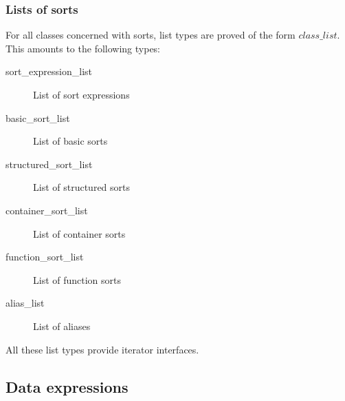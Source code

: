 \documentclass[a4paper,11pt]{article}
\newcommand{\comment}[1]{\begin{quotation} {\sf *** #1 ***} \end{quotation}}
\begin{document}
\subsubsection{Lists of sorts}
For all classes concerned with sorts, list types are proved of the form $class\_list$. This amounts to the following types:
\begin{description}
 \item[sort\_expression\_list] List of sort expressions
 \item[basic\_sort\_list] List of basic sorts
 \item[structured\_sort\_list] List of structured sorts
 \item[container\_sort\_list] List of container sorts
 \item[function\_sort\_list] List of function sorts
 \item[alias\_list] List of aliases
\end{description}

All these list types provide iterator interfaces.

\FloatBarrier
\subsection{Data expressions}
% 
\end{document}
